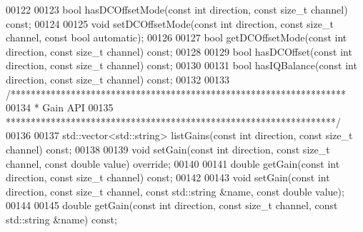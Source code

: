 \begin{DoxyCode}
00122 
00123     \textcolor{keywordtype}{bool} hasDCOffsetMode(\textcolor{keyword}{const} \textcolor{keywordtype}{int} direction, \textcolor{keyword}{const} \textcolor{keywordtype}{size\_t} channel) \textcolor{keyword}{const};
00124 
00125     \textcolor{keywordtype}{void} setDCOffsetMode(\textcolor{keyword}{const} \textcolor{keywordtype}{int} direction, \textcolor{keyword}{const} \textcolor{keywordtype}{size\_t} channel, \textcolor{keyword}{const} \textcolor{keywordtype}{bool} automatic);
00126 
00127     \textcolor{keywordtype}{bool} getDCOffsetMode(\textcolor{keyword}{const} \textcolor{keywordtype}{int} direction, \textcolor{keyword}{const} \textcolor{keywordtype}{size\_t} channel) \textcolor{keyword}{const};
00128 
00129     \textcolor{keywordtype}{bool} hasDCOffset(\textcolor{keyword}{const} \textcolor{keywordtype}{int} direction, \textcolor{keyword}{const} \textcolor{keywordtype}{size\_t} channel) \textcolor{keyword}{const};
00130 
00131     \textcolor{keywordtype}{bool} hasIQBalance(\textcolor{keyword}{const} \textcolor{keywordtype}{int} direction, \textcolor{keyword}{const} \textcolor{keywordtype}{size\_t} channel) \textcolor{keyword}{const};
00132 
00133     \textcolor{comment}{/*******************************************************************}
00134 \textcolor{comment}{     * Gain API}
00135 \textcolor{comment}{     ******************************************************************/}
00136 
00137     std::vector<std::string> listGains(\textcolor{keyword}{const} \textcolor{keywordtype}{int} direction, \textcolor{keyword}{const} \textcolor{keywordtype}{size\_t} channel) \textcolor{keyword}{const};
00138 
00139     \textcolor{keywordtype}{void} setGain(\textcolor{keyword}{const} \textcolor{keywordtype}{int} direction, \textcolor{keyword}{const} \textcolor{keywordtype}{size\_t} channel, \textcolor{keyword}{const} \textcolor{keywordtype}{double} value) \textcolor{keyword}{override};
00140 
00141     \textcolor{keywordtype}{double} getGain(\textcolor{keyword}{const} \textcolor{keywordtype}{int} direction, \textcolor{keyword}{const} \textcolor{keywordtype}{size\_t} channel) \textcolor{keyword}{const};
00142 
00143     \textcolor{keywordtype}{void} setGain(\textcolor{keyword}{const} \textcolor{keywordtype}{int} direction, \textcolor{keyword}{const} \textcolor{keywordtype}{size\_t} channel, \textcolor{keyword}{const} std::string &name, \textcolor{keyword}{const} \textcolor{keywordtype}{double} value);
00144 
00145     \textcolor{keywordtype}{double} getGain(\textcolor{keyword}{const} \textcolor{keywordtype}{int} direction, \textcolor{keyword}{const} \textcolor{keywordtype}{size\_t} channel, \textcolor{keyword}{const} std::string &name) \textcolor{keyword}{const};

\end{DoxyCode}
